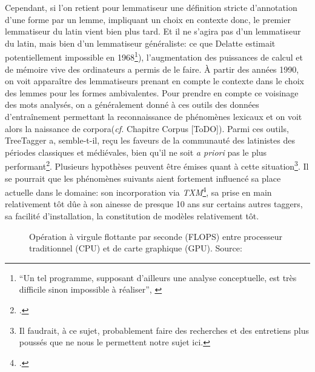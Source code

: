 Cependant, si l'on retient pour lemmatiseur une définition stricte d'annotation d'une forme par un lemme, impliquant un choix en contexte donc, le premier lemmatiseur du latin vient bien plus tard. Et il ne s'agira pas d'un lemmatiseur du latin, mais bien d'un lemmatiseur généraliste: ce que Delatte estimait potentiellement impossible en 1968\footnote{\enquote{Un tel programme, supposant d'ailleurs une analyse conceptuelle, est très difficile sinon impossible à réaliser}, \cite[p.~100]{delatte_index_1968}}), l'augmentation des puissances de calcul et de mémoire vive des ordinateurs a permis de le faire. À partir des années 1990, on voit apparaître des lemmatiseurs prenant en compte le contexte dans le choix des lemmes pour les formes ambivalentes. %
Pour prendre en compte ce voisinage des mots analysés, on a généralement donné à ces outils des données d'entraînement permettant la reconnaissance de phénomènes lexicaux et on voit alors la naissance de corpora(\textit{cf.} Chapitre Corpus [ToDO]). Parmi ces outils, TreeTagger a, semble-t-il, reçu les faveurs de la communauté des latinistes des périodes classiques et médiévales, bien qu'il ne soit \textit{a priori} pas le plus performant\footcite[Voir]{eger_lexicon-assisted_2015}. Plusieurs hypothèses peuvent être émises quant à cette situation\footnote{Il faudrait, à ce sujet, probablement faire des recherches et des entretiens plus poussés que ne nous le permettent notre sujet ici.}. Il se pourrait que les phénomènes suivants aient fortement influencé sa place actuelle dans le domaine: son incorporation via \textit{TXM}\footcite{heiden:halshs-00549779}, sa prise en main relativement tôt dûe à son ainesse de presque 10 ans sur certains autres taggers, sa facilité d'installation, la constitution de modèles relativement tôt. 


\begin{figure}[h]
    \centering
    \caption{Opération à virgule flottante par seconde (FLOPS) entre processeur traditionnel (CPU) et de carte graphique (GPU). Source: \cite{noauthor_cuda_nodate}}
    \label{lemmatisation:histoire:puissance-gpu}
\end{figure}


